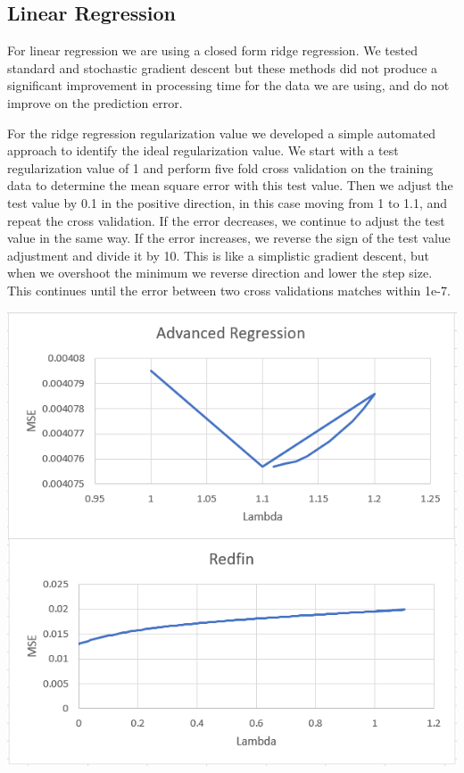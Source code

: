 \documentclass[10pt]{article}
\begin{document}
\begin{multicols}{2}
		\subsection{Linear Regression}
			For linear regression we are using a closed form ridge regression. We tested standard and stochastic gradient descent but these methods did not produce a significant improvement in processing time for the data we are using, and do not improve on the prediction error.
		\par
			For the ridge regression regularization value we developed a simple automated approach to identify the ideal regularization value. We start with a test regularization value of 1 and perform five fold cross validation on the training data to determine the mean square error with this test value. Then we adjust the test value by 0.1 in the positive direction, in this case moving from 1 to 1.1, and repeat the cross validation. If the error decreases, we continue to adjust the test value in the same way. If the error increases, we reverse the sign of the test value adjustment and divide it by 10. This is like a simplistic gradient descent, but when we overshoot the minimum we reverse direction and lower the step size. This continues until the error between two cross validations matches within 1e-7.
		\par
		\begin{center}
                  \captionsetup{type=figure}
			\includegraphics[scale=0.60]{Images/LinearRegressionCrossTrain} \\

\end{center}
\end{multicols}
\end{document}
